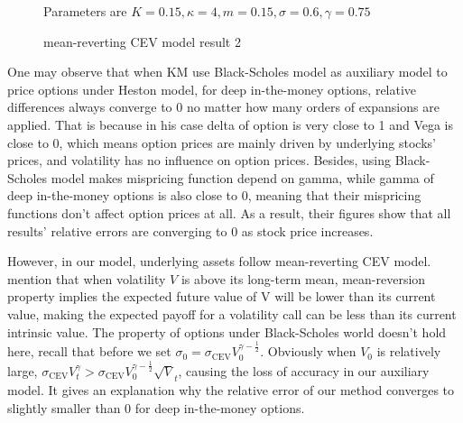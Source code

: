 \begin{figure}[t]
  \hfill
  \caption{mean-reverting CEV model result 2}
  \small{Parameters are $K=0.15, \kappa=4, m=0.15, \sigma=0.6, \gamma=0.75$}
  \label{mrcev res2}
\end{figure}

One may observe that when KM use Black-Scholes model as auxiliary model to price options under Heston model, for deep in-the-money options, relative differences always converge to 0 no matter how many orders of expansions are applied. That is because in his case delta of option is very close to 1 and Vega is close to 0, which means option prices are mainly driven by underlying stocks' prices, and volatility has no influence on option prices. Besides, using Black-Scholes model makes mispricing function depend on gamma, while gamma of deep in-the-money options is also close to 0, meaning that their mispricing functions don't affect option prices at all. As a result, their figures show that all results' relative errors are converging to 0 as stock price increases.

However, in our model, underlying assets follow mean-reverting CEV model. \cite{grunbichler_valuing_1996} mention that when volatility $V$ is above its long-term mean, mean-reversion property implies the expected future value of V will be lower than its current value, making the expected payoff for a volatility call can be less than its current intrinsic value. The property of options under Black-Scholes world doesn't hold here, recall that before we set $\sigma_0 = \sigma_{\text{CEV}}V_0^{\gamma-\frac{1}{2}}$. Obviously when $V_0$ is relatively large, $\sigma_{\text{CEV}} V^{\gamma}_t > \sigma_{\text{CEV}}V_0^{\gamma-\frac{1}{2}} \sqrt{V}_t$, causing the loss of accuracy in our auxiliary model. It gives an explanation why the relative error of our method converges to slightly smaller than 0 for deep in-the-money options. 

